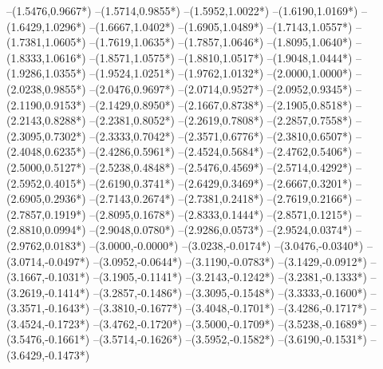 {	--(1.5476,{0.9667*\yskala})
	--(1.5714,{0.9855*\yskala})
	--(1.5952,{1.0022*\yskala})
	--(1.6190,{1.0169*\yskala})
	--(1.6429,{1.0296*\yskala})
	--(1.6667,{1.0402*\yskala})
	--(1.6905,{1.0489*\yskala})
	--(1.7143,{1.0557*\yskala})
	--(1.7381,{1.0605*\yskala})
	--(1.7619,{1.0635*\yskala})
	--(1.7857,{1.0646*\yskala})
	--(1.8095,{1.0640*\yskala})
	--(1.8333,{1.0616*\yskala})
	--(1.8571,{1.0575*\yskala})
	--(1.8810,{1.0517*\yskala})
	--(1.9048,{1.0444*\yskala})
	--(1.9286,{1.0355*\yskala})
	--(1.9524,{1.0251*\yskala})
	--(1.9762,{1.0132*\yskala})
	--(2.0000,{1.0000*\yskala})
	--(2.0238,{0.9855*\yskala})
	--(2.0476,{0.9697*\yskala})
	--(2.0714,{0.9527*\yskala})
	--(2.0952,{0.9345*\yskala})
	--(2.1190,{0.9153*\yskala})
	--(2.1429,{0.8950*\yskala})
	--(2.1667,{0.8738*\yskala})
	--(2.1905,{0.8518*\yskala})
	--(2.2143,{0.8288*\yskala})
	--(2.2381,{0.8052*\yskala})
	--(2.2619,{0.7808*\yskala})
	--(2.2857,{0.7558*\yskala})
	--(2.3095,{0.7302*\yskala})
	--(2.3333,{0.7042*\yskala})
	--(2.3571,{0.6776*\yskala})
	--(2.3810,{0.6507*\yskala})
	--(2.4048,{0.6235*\yskala})
	--(2.4286,{0.5961*\yskala})
	--(2.4524,{0.5684*\yskala})
	--(2.4762,{0.5406*\yskala})
	--(2.5000,{0.5127*\yskala})
	--(2.5238,{0.4848*\yskala})
	--(2.5476,{0.4569*\yskala})
	--(2.5714,{0.4292*\yskala})
	--(2.5952,{0.4015*\yskala})
	--(2.6190,{0.3741*\yskala})
	--(2.6429,{0.3469*\yskala})
	--(2.6667,{0.3201*\yskala})
	--(2.6905,{0.2936*\yskala})
	--(2.7143,{0.2674*\yskala})
	--(2.7381,{0.2418*\yskala})
	--(2.7619,{0.2166*\yskala})
	--(2.7857,{0.1919*\yskala})
	--(2.8095,{0.1678*\yskala})
	--(2.8333,{0.1444*\yskala})
	--(2.8571,{0.1215*\yskala})
	--(2.8810,{0.0994*\yskala})
	--(2.9048,{0.0780*\yskala})
	--(2.9286,{0.0573*\yskala})
	--(2.9524,{0.0374*\yskala})
	--(2.9762,{0.0183*\yskala})
	--(3.0000,{-0.0000*\yskala})
	--(3.0238,{-0.0174*\yskala})
	--(3.0476,{-0.0340*\yskala})
	--(3.0714,{-0.0497*\yskala})
	--(3.0952,{-0.0644*\yskala})
	--(3.1190,{-0.0783*\yskala})
	--(3.1429,{-0.0912*\yskala})
	--(3.1667,{-0.1031*\yskala})
	--(3.1905,{-0.1141*\yskala})
	--(3.2143,{-0.1242*\yskala})
	--(3.2381,{-0.1333*\yskala})
	--(3.2619,{-0.1414*\yskala})
	--(3.2857,{-0.1486*\yskala})
	--(3.3095,{-0.1548*\yskala})
	--(3.3333,{-0.1600*\yskala})
	--(3.3571,{-0.1643*\yskala})
	--(3.3810,{-0.1677*\yskala})
	--(3.4048,{-0.1701*\yskala})
	--(3.4286,{-0.1717*\yskala})
	--(3.4524,{-0.1723*\yskala})
	--(3.4762,{-0.1720*\yskala})
	--(3.5000,{-0.1709*\yskala})
	--(3.5238,{-0.1689*\yskala})
	--(3.5476,{-0.1661*\yskala})
	--(3.5714,{-0.1626*\yskala})
	--(3.5952,{-0.1582*\yskala})
	--(3.6190,{-0.1531*\yskala})
	--(3.6429,{-0.1473*\yskala})
}
